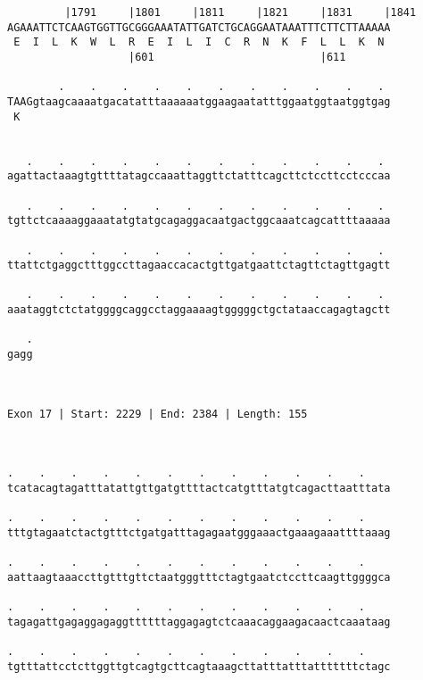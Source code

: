 \documentclass{article}
\begin{document}
\begin{Verbatim}
         |1791     |1801     |1811     |1821     |1831     |1841
AGAAATTCTCAAGTGGTTGCGGGAAATATTGATCTGCAGGAATAAATTTCTTCTTAAAAA
 E  I  L  K  W  L  R  E  I  L  I  C  R  N  K  F  L  L  K  N 
                   |601                          |611       
  
        .    .    .    .    .    .    .    .    .    .    . 
TAAGgtaagcaaaatgacatatttaaaaaatggaagaatatttggaatggtaatggtgag
 K                                                          
                                                            
  
   .    .    .    .    .    .    .    .    .    .    .    . 
agattactaaagtgttttatagccaaattaggttctatttcagcttctccttcctcccaa
                                                            
   .    .    .    .    .    .    .    .    .    .    .    . 
tgttctcaaaaggaaatatgtatgcagaggacaatgactggcaaatcagcattttaaaaa
                                                            
   .    .    .    .    .    .    .    .    .    .    .    . 
ttattctgaggctttggccttagaaccacactgttgatgaattctagttctagttgagtt
                                                            
   .    .    .    .    .    .    .    .    .    .    .    . 
aaataggtctctatggggcaggcctaggaaaagtgggggctgctataaccagagtagctt
                                                            
   .
gagg
    
    
 
Exon 17 | Start: 2229 | End: 2384 | Length: 155



.    .    .    .    .    .    .    .    .    .    .    .    
tcatacagtagatttatattgttgatgttttactcatgtttatgtcagacttaatttata
                                                            
.    .    .    .    .    .    .    .    .    .    .    .    
tttgtagaatctactgtttctgatgatttagagaatgggaaactgaaagaaattttaaag
                                                            
.    .    .    .    .    .    .    .    .    .    .    .    
aattaagtaaaccttgtttgttctaatgggtttctagtgaatctccttcaagttggggca
                                                            
.    .    .    .    .    .    .    .    .    .    .    .    
tagagattgagaggagaggttttttaggagagtctcaaacaggaagacaactcaaataag
                                                            
.    .    .    .    .    .    .    .    .    .    .    .    
tgtttattcctcttggttgtcagtgcttcagtaaagcttatttatttatttttttctagc
                                                            

\end{Verbatim}
\end{document}
